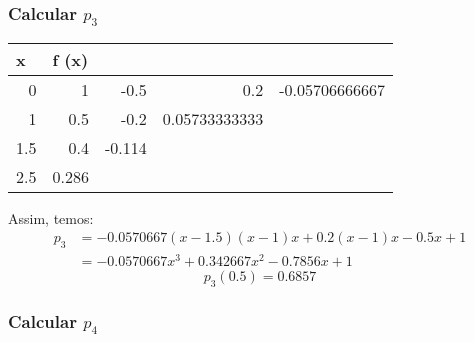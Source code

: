 \documentclass[12pt]{article}
\begin{document}
\subsubsection{Calcular \(p_3\)}
\begin{table}[H]
	\begin{tabular}{@{}rrrll@{}}
		\toprule
		\multicolumn{1}{l}{x} & \multicolumn{1}{l}{f (x)} & \multicolumn{1}{l}{} &                                   &                                    \\ \midrule
		0                     & 1                         & -0.5                 & \multicolumn{1}{r}{0.2}           & \multicolumn{1}{r}{-0.05706666667} \\
		1                     & 0.5                       & -0.2                 & \multicolumn{1}{r}{0.05733333333} &                                    \\
		1.5                   & 0.4                       & -0.114               &                                   &                                    \\
		2.5                   & 0.286                     & \multicolumn{1}{l}{} &                                   &                                    \\ \bottomrule
	\end{tabular}
\end{table}

Assim, temos:
\begin{align*}
	p_3
	 & = -0.0570667(x - 1.5)(x - 1)x + 0.2(x - 1)x - 0.5x + 1 \\
	 & = -0.0570667x^3 + 0.342667x^2 - 0.7856x + 1
\end{align*}
\[\boxed{p_3(0.5) = 0.6857}\]



\subsubsection{Calcular \(p_4\)}
\end{document}
